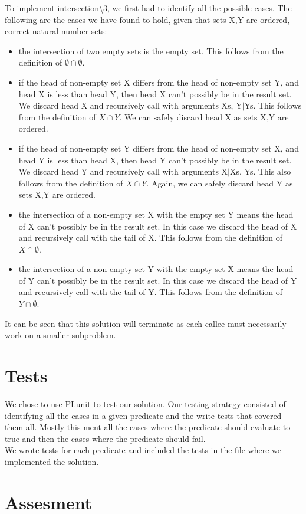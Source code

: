 \documentclass[]{article}
\begin{document}
To implement intersection\textbackslash3, we first had to identify all the possible cases. The following are the cases we have found to hold, given that sets X,Y are ordered, correct natural number sets:

\begin{itemize}
	\item the intersection of two empty sets is the empty set. This follows from the definition of $\emptyset \cap \emptyset$.
	\item if the head of non-empty set X differs from the head of non-empty set Y, and head X is less than head Y, then head X can't possibly be in the result set. We discard head X and recursively call with arguments Xs, Y$|$Ys. This follows from the definition of $X \cap Y$. We can safely discard head X as sets X,Y are ordered.
	\item if the head of non-empty set Y differs from the head of non-empty set X, and head Y is less than head X, then head Y can't possibly be in the result set. We discard head Y and recursively call with arguments X$|$Xs, Ys. This also follows from the definition of $X \cap Y$. Again, we can safely discard head Y as sets X,Y are ordered.
	\item the intersection of a non-empty set X with the empty set Y means the head of X can't possibly be in the result set. In this case we discard the head of X and recursively call with the tail of X. This follows from the definition of $X \cap \emptyset$.
	\item the intersection of a non-empty set Y with the empty set X means the head of Y can't possibly be in the result set. In this case we discard the head of Y and recursively call with the tail of Y. This follows from the definition of $Y \cap \emptyset$.

\end{itemize}

It can be seen that this solution will terminate as each callee must necessarily work on a smaller subproblem.\par

\section{Tests} %
\label{sec:tests}
We chose to use PLunit to test our solution. Our testing strategy consisted of identifying all the cases in a given predicate and the write tests that covered them all. Mostly this ment all the cases where the predicate should evaluate to true and then the cases where the predicate should fail. \\
We wrote tests for each predicate and included the tests in the file where we implemented the solution.

\section{Assesment} %
\label{sec:assesment}



\end{document}
